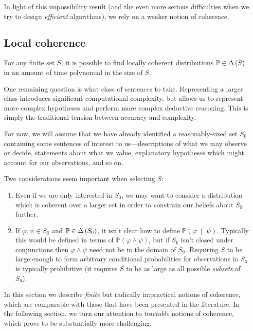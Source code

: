 \documentclass[12pt]{article}
\theoremstyle{definition}
\newcommand{\of}[1]{\left(#1\right)}
\newcommand{\ofc}[2]{\left(#1\;\middle\vert\;#2\right)}
\newcommand{\PP}{\mathbb{P}}
\newcommand{\Pc}[2]{\PP\ofc{#1}{#2}}
\renewcommand{\P}[1]{\mathbb{P}\of{#1}}
\newcommand{\vp}{\varphi}
\begin{document}
In light of this impossibility result (and the even more 
serious difficulties when we try to design \emph{efficient}
algorithms), we rely on a weaker notion of coherence.

\subsection{Local coherence}

For any finite set $S$, it is possible to find
locally coherent distributions $\PP \in \D{S}$
in an amount of time polynomial in the size of $S$.

One remaining question is what class of sentences to take.
Representing a larger class introduces significant computational complexity,
but allows us to represent more complex hypotheses and perform
more complex deductive reasoning.
This is simply the traditional tension between accuracy and complexity.

For now, we will 
assume that we have already identified a reasonably-sized set $S_0$
containing some sentences of interest to us---descriptions of
what we may observe or decide, statements about
what we value, explanatory hypotheses which might account for our
observations, and so on.

Two considerations seem important when selecting $S$:
\begin{enumerate}
\item Even if we are only interested in $S_0$,
we may want to consider a distribution which is coherent
over a larger set in order to constrain our beliefs about $S_0$
further.
\item If $\vp, \psi \in S_0$ and $\PP \in \D{S_0}$,
it isn't clear how to define $\Pc{\vp}{\psi}$.
Typically this would be defined in terms of $\P{\vp \wedge \psi}$,
but if $S_0$ isn't closed under conjunctions then $\vp \wedge \psi$
need not be in the domain of $S_0$.
Requiring $S$ to be large enough to form arbitrary conditional probabilities
for observations in $S_0$
is typically prohibitive (it requires $S$ to be as large as all possible
\emph{subsets} of $S_0$).
\end{enumerate}

In this section we describe \emph{finite} but radically impractical
notions of coherence, which are comparable with those that
have been presented in the literature.
In the following section, we turn our attention to \emph{tractable}
notions of coherence,
which prove to be substantially more challenging.
\end{document}
